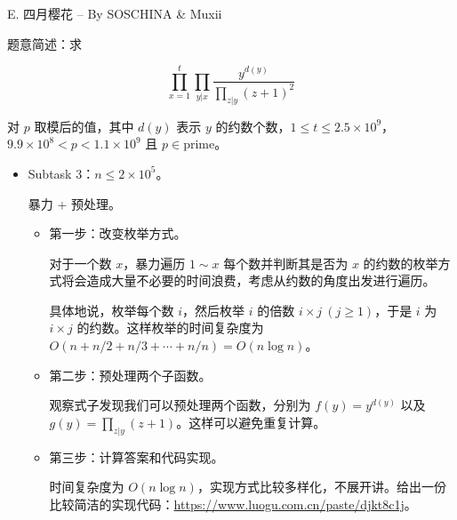 \documentclass[10pt,aspectratio=43,mathserif]{beamer}
\begin{document}
\begin{frame} \setlength{\parskip}{0.4\baselineskip}

	{\large E. 四月樱花 -- By SOSCHINA \& Muxii}

	题意简述：求

	$$\prod_{x=1}^t\prod_{y|x} \frac{y^{d(y)}}{\prod_{z|y}(z+1)^2}$$

	对 $p$ 取模后的值，其中 $d(y)$ 表示 $y$ 的约数个数，$1\leq t\leq 2.5\times 10^9$，$9.9\times 10^8<p<1.1\times 10^9$ 且 $p\in \mathrm{prime}$。

\end{frame}

\begin{frame}

	\begin{itemize} \setlength{\parskip}{0.4\baselineskip}

		\item Subtask 3：$n\leq 2\times 10^5$。

		暴力 + 预处理。

		\begin{itemize} \setlength{\parskip}{0.4\baselineskip}

			\item 第一步：改变枚举方式。

			对于一个数 $x$，暴力遍历 $1\sim x$ 每个数并判断其是否为 $x$ 的约数的枚举方式将会造成大量不必要的时间浪费，考虑从约数的角度出发进行遍历。

			具体地说，枚举每个数 $i$，然后枚举 $i$ 的倍数 $i\times j\ (j\geq 1)$，于是 $i$ 为 $i\times j$ 的约数。这样枚举的时间复杂度为 $O(n+n/2+n/3+\cdots+n/n)=O(n\log n)$。

			\item 第二步：预处理两个子函数。

			观察式子发现我们可以预处理两个函数，分别为 $f(y)=y^{d(y)}$ 以及 $g(y)=\prod_{z|y}(z+1)$。这样可以避免重复计算。

			\item 第三步：计算答案和代码实现。

			时间复杂度为 $O(n\log n)$，实现方式比较多样化，不展开讲。给出一份比较简洁的实现代码：\url{https://www.luogu.com.cn/paste/djkt8c1j}。

		\end{itemize}

	\end{itemize}

\end{frame}
\end{document}
